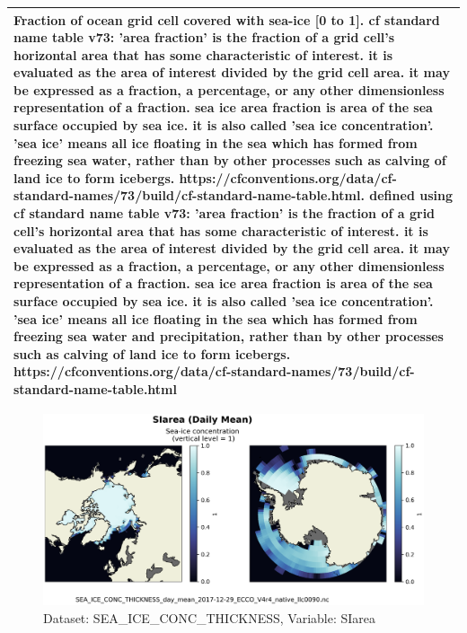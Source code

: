 \begin{longtable}{|m{}|m{}|m{}|m{}|}
\multicolumn{4}{|p{1\textwidth}|}{\footnotesize{{Fraction of ocean grid cell covered with sea-ice [0 to 1]. cf standard name table v73:  'area fraction' is the fraction of a grid cell's horizontal area that has some characteristic of interest. it is evaluated as the area of interest divided by the grid cell area. it may be expressed as a fraction, a percentage, or any other dimensionless representation of a fraction. sea ice area fraction is area of the sea surface occupied by sea ice. it is also called 'sea ice concentration'. 'sea ice' means all ice floating in the sea which has formed from freezing sea water, rather than by other processes such as calving of land ice to form icebergs. https://cfconventions.org/data/cf-standard-names/73/build/cf-standard-name-table.html. defined using cf standard name table v73: 'area fraction' is the fraction of a grid cell's horizontal area that has some characteristic of interest. it is evaluated as the area of interest divided by the grid cell area. it may be expressed as a fraction, a percentage, or any other dimensionless representation of a fraction. sea ice area fraction is area of the sea surface occupied by sea ice. it is also called 'sea ice concentration'. 'sea ice' means all ice floating in the sea which has formed from freezing sea water and precipitation, rather than by other processes such as calving of land ice to form icebergs. https://cfconventions.org/data/cf-standard-names/73/build/cf-standard-name-table.html}}} \\ \hline
\end{longtable}

\begin{figure}[H]
\centering
\includegraphics[scale=0.55]{../images/plots/v4r4/native_plots/Sea-Ice_and_Snow_Concentration_and_Thickness/SIarea.png}
\caption{Dataset: SEA\_ICE\_CONC\_THICKNESS, Variable: SIarea}
\label{tab:table-SEA_ICE_CONC_THICKNESS_SIarea-Plot}
\end{figure}
\newpage
\pagebreak
